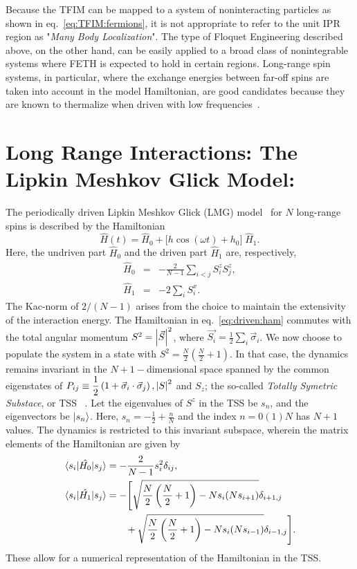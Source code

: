 \documentclass[%
reprint,
superscriptaddress,
amsmath,amssymb,
aps,
prb,
showkeys,
]{revtex4-2}
\begin{document}
{Because the TFIM can be mapped to a system of noninteracting particles as shown in eq.}~\ref{eq:TFIM:fermions}, it is not appropriate to refer to the unit IPR region as "\emph{Many Body Localization}". The type of Floquet Engineering described above, on the other hand, can be easily applied to a broad class of nonintegrable systems where FETH is expected to hold in certain regions. Long-range spin systems, in particular, where the exchange energies between far-off spins are taken into account in the model Hamiltonian, are good candidates because they are known to thermalize when driven with low frequencies~\cite{russomanno_thermalization_2015}.
\section{\label{sec:level3}Long Range Interactions: The Lipkin Meshkov Glick Model: }	
The periodically driven {Lipkin Meshkov Glick (LMG)} model~\cite{lmg1965_1,defenu2018} for $N$ long-range spins is described by the Hamiltonian
\begin{equation}
	\hat{H}(t) = \hat{H}_0 + \big[h \cos{(\omega t)} + h_0\big]\; \hat{H}_1.
	\label{eq:driven:ham}
\end{equation}
Here, the undriven part $\hat{H}_0$ and the driven part $\hat{H}_1$ are, respectively, 
	\begin{eqnarray}
		\hat{H}_0 &=& -\frac{2}{N-1} \sum_{i<j}S^z_i S^z_j,\nonumber \\
		\hat{H}_1 &=& -2 \sum_i S^x_i.
		\label{eq:h0h1}
	\end{eqnarray}
	The Kac-norm of $2/(N-1)$ arises from the choice to maintain the extensivity of the interaction energy. The Hamiltonian in eq.~\ref{eq:driven:ham} commutes
with the total angular momentum $S^2 = \abs{\vec{S}}^2$, where $\vec{S_i}=\frac12 \sum_i \vec{\sigma}_i$. We now choose to populate the system in a state with $S^2=\displaystyle\frac{N}{2}\left(\frac{N}{2}+1\right)$. In that case, the dynamics remains invariant in the  $N+1-$dimensional space spanned by the common eigenstates of $P_{ij} \equiv \displaystyle\frac{1}{2}\left(1+ \vec{\sigma}_i\cdot\vec{\sigma}_j\right), \abs{S}^2$ and $S_z$; the so-called \textit{ Totally Symetric Substace}, or TSS ~\cite{mori_prethermalization_2019}. Let the eigenvalues of $S^z$ in the TSS be $s_n$, and the eigenvectors be $\ket{s_n}$. Here, $s_n=-\frac{1}{2}+\frac{n}{N}$ and the index
$n= 0 (1) N$ has $N+1$ values. The dynamics is restricted to this invariant subspace, wherein the matrix elements of the Hamiltonian are given by
\begin{align}
	\mel{s_i}{\hat{H_0}}{s_j} &= -\frac{2}{N-1} s^2_i \delta_{ij},\nonumber\\
	\mel{s_i}{\hat{H_1}}{s_j} &= -\Bigg[\sqrt{\frac{N}{2}\left(\frac{N}{2}+1\right) - Ns_i(Ns_{i + 1})}\delta_{i+1, j} \nonumber\\ 
	&\hskip 0.7cm +\sqrt{\frac{N}{2}\left(\frac{N}{2}+1\right) - Ns_i(Ns_{i- 1})}\delta_{i-1,j}\Bigg].
	\label{eq:lmg:tssham}
\end{align}
These allow for a numerical representation of the Hamiltonian in the TSS.
\end{document}

